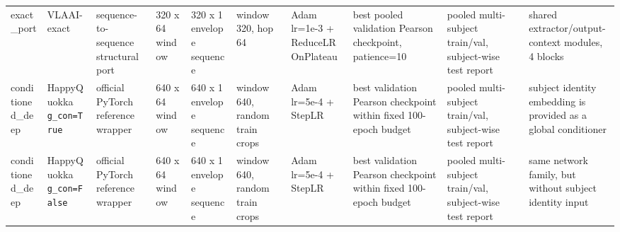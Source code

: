 \documentclass[11pt]{article}
\begin{document}
\begin{longtable}{p{1.4cm} p{1.6cm} p{2.2cm} p{1.8cm} p{1.8cm} p{2.0cm} p{2.4cm} p{2.6cm} p{2.0cm} p{2.8cm}}
exact\_port & VLAAI-exact & sequence-to-sequence structural port & 320 x 64 window & 320 x 1 envelope sequence & window 320, hop 64 & Adam lr=1e-3 + ReduceLROnPlateau & best pooled validation Pearson checkpoint, patience=10 & pooled multi-subject train/val, subject-wise test report & shared extractor/output-context modules, 4 blocks \\
conditioned\_deep & HappyQuokka \texttt{g\_con=True} & official PyTorch reference wrapper & 640 x 64 window & 640 x 1 envelope sequence & window 640, random train crops & Adam lr=5e-4 + StepLR & best validation Pearson checkpoint within fixed 100-epoch budget & pooled multi-subject train/val, subject-wise test report & subject identity embedding is provided as a global conditioner \\
conditioned\_deep & HappyQuokka \texttt{g\_con=False} & official PyTorch reference wrapper & 640 x 64 window & 640 x 1 envelope sequence & window 640, random train crops & Adam lr=5e-4 + StepLR & best validation Pearson checkpoint within fixed 100-epoch budget & pooled multi-subject train/val, subject-wise test report & same network family, but without subject identity input \\
\bottomrule
\end{longtable}
\end{document}
